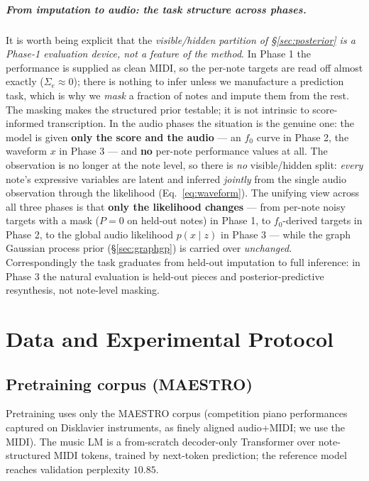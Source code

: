 \documentclass[11pt,a4paper]{report}
\begin{document}
\paragraph{From imputation to audio: the task structure across phases.}
It is worth being explicit that the \emph{visible/hidden partition of
\S\ref{sec:posterior} is a Phase-1 evaluation device, not a feature of the method}.
In Phase 1 the performance is supplied as clean MIDI, so the per-note targets are
read off almost exactly ($\Sigma_e \approx 0$); there is nothing to infer unless we
manufacture a prediction task, which is why we \emph{mask} a fraction of notes and
impute them from the rest. The masking makes the structured prior testable; it is
not intrinsic to score-informed transcription. In the audio phases the situation is
the genuine one: the model is given \textbf{only the score and the audio} --- an
$f_0$ curve in Phase 2, the waveform $x$ in Phase 3 --- and \textbf{no} per-note
performance values at all. The observation is no longer at the note level, so there
is \emph{no} visible/hidden split: \emph{every} note's expressive variables are
latent and inferred \emph{jointly} from the single audio observation through the
likelihood (Eq.~\eqref{eq:waveform}). The unifying view across all three phases is
that \textbf{only the likelihood changes} --- from per-note noisy targets with a mask
($P = 0$ on held-out notes) in Phase 1, to $f_0$-derived targets in Phase 2, to the
global audio likelihood $p(x \mid z)$ in Phase 3 --- while the graph Gaussian process
prior (\S\ref{sec:graphgp}) is carried over \emph{unchanged}. Correspondingly the
task graduates from held-out imputation to full inference: in Phase 3 the natural
evaluation is held-out pieces and posterior-predictive resynthesis, not note-level
masking.

\chapter{Data and Experimental Protocol}\label{ch:data}

\section{Pretraining corpus (MAESTRO)}
Pretraining uses only the MAESTRO corpus \cite{maestro} (competition piano
performances captured on Disklavier instruments, as finely aligned audio+MIDI; we
use the MIDI). The music LM is a from-scratch decoder-only Transformer over
note-structured MIDI tokens, trained by next-token prediction; the reference model
reaches validation perplexity $10.85$.
\end{document}
